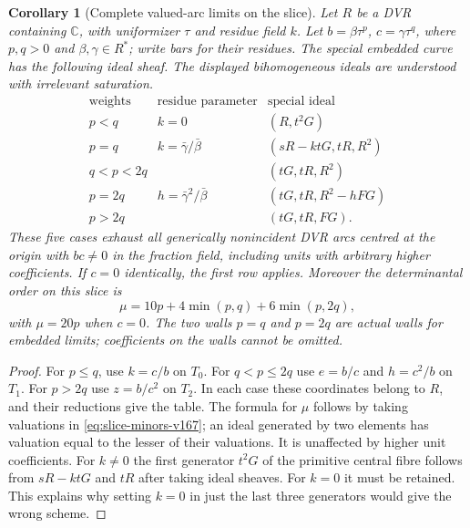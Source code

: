 \documentclass[11pt,reqno]{amsart}
\numberwithin{equation}{section}
\newtheorem{corollary}[theorem]{Corollary}
\theoremstyle{definition}\newtheorem{definition}[theorem]{Definition}
\theoremstyle{remark}\newtheorem{remark}[theorem]{Remark}
\newcommand{\C}{\mathbb C}\newcommand{\Q}{\mathbb Q}
\begin{document}
\begin{corollary}[Complete valued-arc limits on the slice]
\label{cor:slice-chambers-v167}
Let $R$ be a DVR containing $\C$, with uniformizer $\tau$ and
residue field $k$. Let $b=\beta\tau^p$, $c=\gamma\tau^q$, where
$p,q>0$ and $\beta,\gamma\in R^*$; write bars for their residues.
The special embedded curve
has the following ideal sheaf. The displayed bihomogeneous
ideals are understood with irrelevant saturation.
\begin{equation}\label{eq:slice-table-v167}
\begin{array}{c|c|c}
 \text{weights}&\text{residue parameter}&\text{special ideal}\\ \hline
 p<q&k=0&(R,t^2G)\\
 p=q&k=\bar\gamma/\bar\beta&(sR-ktG,tR,R^2)\\
 q<p<2q&& (tG,tR,R^2)\\
 p=2q&h=\bar\gamma^2/\bar\beta&(tG,tR,R^2-hFG)\\
 p>2q&& (tG,tR,FG).
\end{array}
\end{equation}
These five cases exhaust all generically nonincident DVR arcs
centred at the origin with $bc\ne0$ in the fraction field,
including units with arbitrary higher coefficients. If $c=0$
identically, the first row applies. Moreover the determinantal
order on this slice is
\begin{equation}\label{eq:slice-jet-order-v167}
 \mu=10p+4\min(p,q)+6\min(p,2q),
\end{equation}
with $\mu=20p$ when $c=0$.
The two walls $p=q$ and $p=2q$ are actual walls for embedded
limits; coefficients on the walls cannot be omitted.
\end{corollary}
\begin{proof}
For $p\leq q$, use $k=c/b$ on $T_0$. For $q<p\leq2q$ use
$e=b/c$ and $h=c^2/b$ on $T_1$. For $p>2q$ use $z=b/c^2$
on $T_2$. In each case these coordinates belong to $R$, and their
reductions give the table. The formula for $\mu$ follows by taking valuations in
\eqref{eq:slice-minors-v167}; an ideal generated by two elements
has valuation equal to the lesser of their valuations. It is
unaffected by higher unit coefficients. For $k\ne0$ the first generator
$t^2G$ of the primitive central fibre follows from
$sR-ktG$ and $tR$ after taking ideal sheaves. For $k=0$ it must
be retained. This explains why setting $k=0$ in just the last
three generators would give the wrong scheme.
\end{proof}
\end{document}
